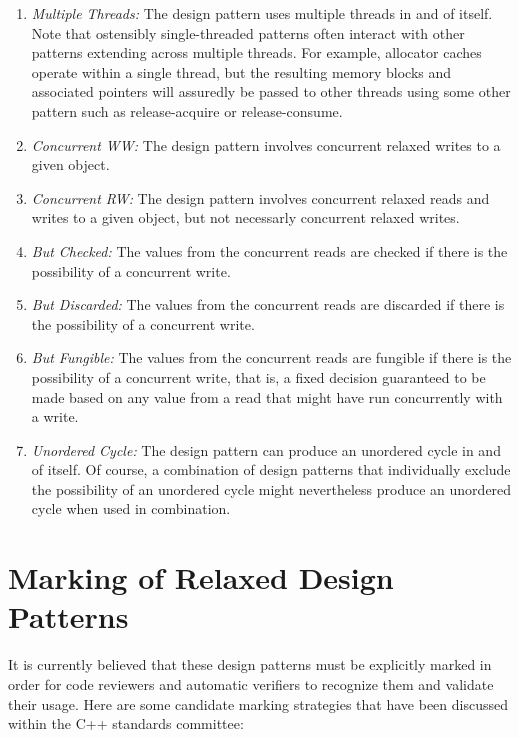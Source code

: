 \documentclass[10]{article}
\begin{document}
\begin{enumerate}
\item	\emph{Multiple Threads:}  The design pattern uses multiple threads
	in and of itself.
	Note that ostensibly single-threaded patterns often interact
	with other patterns extending across multiple threads.
	For example, allocator caches operate within a single
	thread, but the resulting memory blocks and associated pointers
	will assuredly be passed to other threads using some other
	pattern such as release-acquire or release-consume.
\item	\emph{Concurrent WW:}  The design pattern involves concurrent
	relaxed writes to a given object.
\item	\emph{Concurrent RW:}  The design pattern involves concurrent
	relaxed reads and writes to a given object, but not necessarly
	concurrent relaxed writes.
\item	\emph{But Checked:}  The values from the concurrent reads are
	checked if there is the possibility of a concurrent write.
\item	\emph{But Discarded:}  The values from the concurrent reads are
	discarded if there is the possibility of a concurrent write.
\item	\emph{But Fungible:}  The values from the concurrent reads are
	fungible if there is the possibility of a concurrent write,
	that is, a fixed decision guaranteed to be made based on any
	value from a read that might have run concurrently with a write.
\item	\emph{Unordered Cycle:}  The design pattern can produce an
	unordered cycle in and of itself.
	Of course, a combination of design patterns that individually
	exclude the possibility of an unordered cycle might nevertheless
	produce an unordered cycle when used in combination.
\end{enumerate}

\section{Marking of Relaxed Design Patterns}
\label{sec:Marking of Relaxed Design Patterns}

It is currently believed that these design patterns must be explicitly marked
in order for code reviewers and automatic verifiers to recognize them
and validate their usage.
Here are some candidate marking strategies that have been discussed
within the C++ standards committee:
\end{document}
